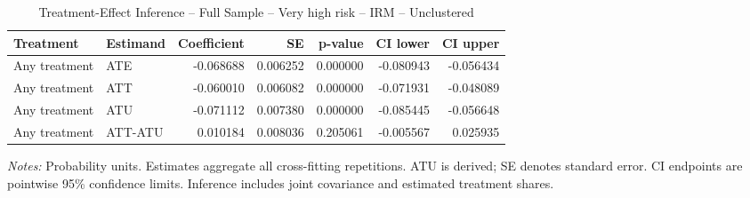\begin{table}[htbp]
\centering
\caption{Treatment-Effect Inference -- Full Sample -- Very high risk -- IRM -- Unclustered}
\label{tab:inference-VeryHighRiskHome-IRM-iid}
\scriptsize
\begin{adjustbox}{max width=\linewidth}
\begin{tabular}{llrrrrr}
\toprule
Treatment & Estimand & Coefficient & SE & p-value & CI lower & CI upper \\
\midrule
Any treatment & ATE & -0.068688 & 0.006252 & 0.000000 & -0.080943 & -0.056434 \\
Any treatment & ATT & -0.060010 & 0.006082 & 0.000000 & -0.071931 & -0.048089 \\
Any treatment & ATU & -0.071112 & 0.007380 & 0.000000 & -0.085445 & -0.056648 \\
Any treatment & ATT-ATU & 0.010184 & 0.008036 & 0.205061 & -0.005567 & 0.025935 \\
\bottomrule
\end{tabular}

\end{adjustbox}
\par\smallskip
\begin{minipage}{\linewidth}\scriptsize \textit{Notes:} Probability units. Estimates aggregate all cross-fitting repetitions. ATU is derived; SE denotes standard error. CI endpoints are pointwise 95\% confidence limits. Inference includes joint covariance and estimated treatment shares. \end{minipage}
\end{table}

